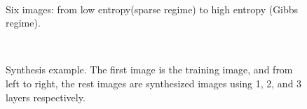 \documentclass[11pt]{article}
\begin{document}
\begin{figure}[h]
	\centering
	\setlength{\fboxrule}{1pt}
	\setlength{\fboxsep}{0cm}	
	\\[3px]
	\caption{Six images: from low entropy(sparse regime) to high entropy (Gibbs regime).}
\end{figure}

\begin{figure}[h]
	\centering
	\setlength{\fboxrule}{1pt}
	\setlength{\fboxsep}{0cm}	
	\\[3px]
	\caption{Synthesis example. The first image is the training image, and from left to right, the rest images are synthesized images using 1, 2, and 3 layers respectively.}
	\label{fig:syn}
\end{figure}
\end{document}
